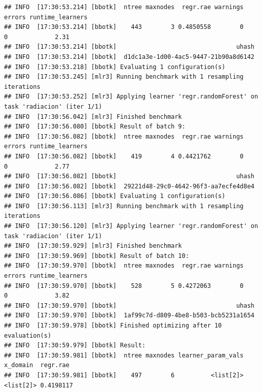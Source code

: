 \documentclass[
  11pt,
  a4paper,
]{article}
\newenvironment{Shaded}{\begin{snugshade}}{\end{snugshade}}
\newcommand{\CommentTok}[1]{\textcolor[rgb]{0.56,0.35,0.01}{\textit{#1}}}
\newcommand{\DecValTok}[1]{\textcolor[rgb]{0.00,0.00,0.81}{#1}}
\newcommand{\FunctionTok}[1]{\textcolor[rgb]{0.00,0.00,0.00}{#1}}
\newcommand{\NormalTok}[1]{#1}
\newcommand{\OtherTok}[1]{\textcolor[rgb]{0.56,0.35,0.01}{#1}}
\newcommand{\SpecialCharTok}[1]{\textcolor[rgb]{0.00,0.00,0.00}{#1}}
\begin{document}
\begin{verbatim}
## INFO  [17:30:53.214] [bbotk]  ntree maxnodes  regr.rae warnings errors runtime_learners
## INFO  [17:30:53.214] [bbotk]    443        3 0.4850558        0      0             2.31
## INFO  [17:30:53.214] [bbotk]                                 uhash
## INFO  [17:30:53.214] [bbotk]  d1dc1a3e-1d00-4ac5-9447-21b90a8d6142
## INFO  [17:30:53.218] [bbotk] Evaluating 1 configuration(s)
## INFO  [17:30:53.245] [mlr3] Running benchmark with 1 resampling iterations
## INFO  [17:30:53.252] [mlr3] Applying learner 'regr.randomForest' on task 'radiacion' (iter 1/1)
## INFO  [17:30:56.042] [mlr3] Finished benchmark
## INFO  [17:30:56.080] [bbotk] Result of batch 9:
## INFO  [17:30:56.082] [bbotk]  ntree maxnodes  regr.rae warnings errors runtime_learners
## INFO  [17:30:56.082] [bbotk]    419        4 0.4421762        0      0             2.77
## INFO  [17:30:56.082] [bbotk]                                 uhash
## INFO  [17:30:56.082] [bbotk]  29221d48-29c0-4642-96f3-aa7ecfe4d8e4
## INFO  [17:30:56.086] [bbotk] Evaluating 1 configuration(s)
## INFO  [17:30:56.113] [mlr3] Running benchmark with 1 resampling iterations
## INFO  [17:30:56.120] [mlr3] Applying learner 'regr.randomForest' on task 'radiacion' (iter 1/1)
## INFO  [17:30:59.929] [mlr3] Finished benchmark
## INFO  [17:30:59.969] [bbotk] Result of batch 10:
## INFO  [17:30:59.970] [bbotk]  ntree maxnodes  regr.rae warnings errors runtime_learners
## INFO  [17:30:59.970] [bbotk]    528        5 0.4272063        0      0             3.82
## INFO  [17:30:59.970] [bbotk]                                 uhash
## INFO  [17:30:59.970] [bbotk]  1af99c7d-d809-4be8-b503-bcb5231a1654
## INFO  [17:30:59.978] [bbotk] Finished optimizing after 10 evaluation(s)
## INFO  [17:30:59.979] [bbotk] Result:
## INFO  [17:30:59.981] [bbotk]  ntree maxnodes learner_param_vals  x_domain  regr.rae
## INFO  [17:30:59.981] [bbotk]    497        6          <list[2]> <list[2]> 0.4198117
\end{verbatim}

\begin{Shaded}
\end{Shaded}
\end{document}
